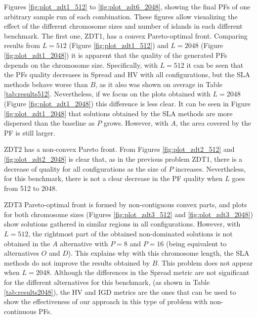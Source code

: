 \documentclass[preprint]{elsarticle}
\begin{document}
Figures \ref{fig:plot_zdt1_512} to \ref{fig:plot_zdt6_2048}, showing the final PFs of one arbitrary sample run of each combination. These figures allow visualizing the effect of the different chromosome sizes and number of islands in each different benchmark. The first one, ZDT1, has a convex Pareto-optimal front. Comparing results from $L=512$ (Figure \ref{fig:plot_zdt1_512}) and $L=2048$ (Figure \ref{fig:plot_zdt1_2048}) it is apparent that the quality of the generated PFs depends on the chromosome size. Specifically, with $L=512$ it can be seen that the PFs quality decreases in Spread and HV with all configurations, but the SLA methods behave worse than $B$, as it also was shown on average in Table \ref{tab:results512}. Nevertheless, if we focus on the plots obtained with $L=2048$ (Figure \ref{fig:plot_zdt1_2048}) this difference is less clear. It can be seen in Figure \ref{fig:plot_zdt1_2048} that solutions obtained by the SLA methods are more dispersed than the baseline as $P$ grows. However, with $A$, the area covered by the PF is still larger.

ZDT2 has a non-convex Pareto front. From Figures \ref{fig:plot_zdt2_512} and \ref{fig:plot_zdt2_2048} is clear that, as in the previous problem ZDT1, there is a decrease of quality for all configurations as the size of $P$ increases.  Nevertheless, for this benchmark, there is not a clear decrease in the PF quality when $L$ goes from 512 to 2048.

ZDT3 Pareto-optimal front is formed by non-contiguous convex parts, and plots for both chromosome sizes (Figures \ref{fig:plot_zdt3_512} and \ref{fig:plot_zdt3_2048}) show solutions gathered in similar regions in all configurations. However, with $L=512$, the rightmost part of the obtained non-dominated solutions is not obtained in the $A$ alternative with $P=8$  and $P=16$ (being equivalent to alternatives $O$ and $D$). This explains why with this chromosome length, the SLA methods do not improve the results obtained by $B$. This problem does not appear when $L=2048$. Although the differences in the Spread metric are not significant for the different alternatives for this benchmark, (as shown in Table \ref{tab:results2048}), the HV and IGD metrics are the ones that can be used to show the effectiveness of our approach in this type of problem with non-continuous PFs.
\end{document}
